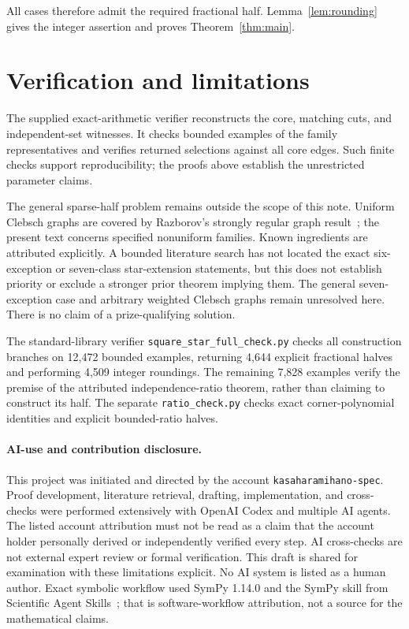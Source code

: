 \documentclass[11pt]{article}
\begin{document}
All cases therefore admit the required fractional half.
Lemma~\ref{lem:rounding} gives the integer assertion and proves
Theorem~\ref{thm:main}.





\section{Verification and limitations}
The supplied exact-arithmetic verifier reconstructs the core, matching
cuts, and independent-set witnesses. It checks bounded examples of the
family representatives and verifies returned selections against all core edges.
Such finite checks support reproducibility; the proofs above establish
the unrestricted parameter claims.

The general sparse-half problem remains outside the scope of this note.
Uniform Clebsch graphs are covered by Razborov's strongly regular graph
result~\cite[Theorem 3.5 and Section 4.4]{R}; the present text concerns
specified nonuniform families. Known ingredients are attributed explicitly.
A bounded literature search has not located the exact six-exception or
seven-class star-extension statements, but this does not establish priority
or exclude a stronger prior theorem implying them.
The general seven-exception case and arbitrary weighted Clebsch graphs
remain unresolved here. There is no claim of a prize-qualifying solution.

The standard-library verifier \texttt{square\_star\_full\_check.py}
checks all construction branches on 12,472 bounded examples, returning
4,644 explicit fractional halves and performing 4,509 integer roundings.
The remaining 7,828 examples verify the premise of the attributed
independence-ratio theorem, rather than claiming to construct its half.
The separate \texttt{ratio\_check.py} checks exact corner-polynomial
identities and explicit bounded-ratio halves.

\paragraph{AI-use and contribution disclosure.}
This project was initiated and directed by the account
\texttt{kasaharamihano-spec}.
Proof development, literature retrieval, drafting, implementation, and
cross-checks were performed extensively with OpenAI Codex and multiple
AI agents. The listed account attribution must not be read as a claim that
the account holder personally derived or independently verified every step.
AI cross-checks are not external expert review or formal verification.
This draft is shared for examination with these limitations explicit.
No AI system is listed as a human author.
Exact symbolic workflow used SymPy 1.14.0 and the SymPy skill from
Scientific Agent Skills~\cite{K}; that is software-workflow attribution,
not a source for the mathematical claims.
\end{document}
